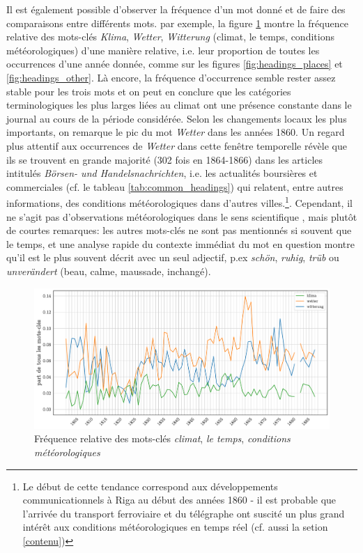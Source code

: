 \documentclass[a4paper,twoside,12pt]{article}
\begin{document}
Il est également possible d'observer la fréquence d'un mot donné et de faire des comparaisons entre différents mots. par exemple, la figure \ref{fig:wetter_witterung_klima} montre la fréquence relative des mots-clés \textit{Klima}, \textit{Wetter}, \textit{Witterung} (climat, le temps, conditions météorologiques) d'une manière relative, i.e. leur proportion de toutes les occurrences d'une année donnée, comme sur les figures \ref{fig:headings_places} et \ref{fig:headings_other}. Là encore, la fréquence d'occurrence semble rester assez stable pour les trois mots et on peut en conclure que les catégories terminologiques les plus larges liées au climat ont une présence constante dans le journal au cours de la période considérée. Selon les changements locaux les plus importants, on remarque le pic du mot \textit{Wetter} dans les années 1860. Un regard plus attentif aux occurrences de \textit{Wetter} dans cette fenêtre temporelle révèle que ils se trouvent en grande majorité (302 fois en 1864-1866) dans les articles intitulés \textit{Börsen- und Handelsnachrichten}, i.e. les actualités boursières et commerciales (cf. le tableau \ref{tab:common_headings}) qui relatent, entre autres informations, des conditions météorologiques dans d'autres villes.\footnote{Le début de cette tendance correspond aux développements communicationnels à Riga au début des années 1860 - il est probable que l'arrivée du transport ferroviaire et du télégraphe ont suscité un plus grand intérêt aux conditions météorologiques en temps réel (cf. aussi la setion \ref{contenu})}. Cependant, il ne s'agit pas d'observations météorologiques dans le sens \og scientifique \fg{}, mais plutôt de courtes remarques: les autres mots-clés ne sont pas mentionnés si souvent que le temps, et une analyse rapide du contexte immédiat du mot en question montre qu'il est le plus souvent décrit avec un seul adjectif, p.ex \textit{schön}, \textit{ruhig}, \textit{trüb} ou \textit{unverändert} (beau, calme, maussade, inchangé).


\begin{figure}[h]
    \centering
    \includegraphics[width=\textwidth]{images/wetter_witterung_klima.pdf}
    \caption{Fréquence relative des mots-clés \textit{climat}, \textit{le temps}, \textit{conditions météorologiques}}
    \label{fig:wetter_witterung_klima}
\end{figure}
\end{document}
